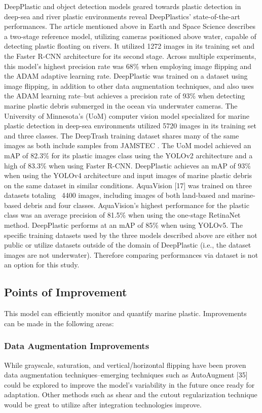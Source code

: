 \documentclass[a4paper,fleqn]{cas-dc}
\begin{document}
DeepPlastic and object detection models geared towards plastic detection in deep-sea and river plastic environments reveal DeepPlastics’ state-of-the-art performances.
The article mentioned above in Earth and Space Science \cite{https://doi.org/10.1029/2019EA000960} describes a two-stage reference model, utilizing cameras positioned above water, capable of detecting plastic floating on rivers. It utilized 1272 images in its training set and the Faster R-CNN architecture for its second stage. Across multiple experiments, this model’s highest precision rate was  68\% when employing image flipping and the ADAM adaptive learning rate. DeepPlastic was trained on a dataset using image flipping, in addition to other data augmentation techniques, and also uses the ADAM learning rate--but achieves a precision rate of 93\% when detecting marine plastic debris submerged in the ocean via underwater cameras.
The University of Minnesota’s (UoM) computer vision model \cite{fulton2018robotic} specialized for marine plastic detection in deep-sea environments utilized 5720 images in its training set and three classes. The DeepTrash training dataset shares many of the same images as both include samples from JAMSTEC \cite{JAMSTEC}. The UoM model achieved an mAP of 82.3\% for its plastic images class using the YOLOv2 architecture and a high of 83.3\% when using Faster R-CNN. DeepPlastic achieves an mAP of 93\% when using the YOLOv4 architecture and input images of marine plastic debris on the same dataset in similar conditions. 
AquaVision [17] was trained on three datasets totaling ~4400 images, including images of both land-based and marine-based debris and four classes. AquaVision’s highest performance for the plastic class was an average precision of 81.5\% when using the one-stage RetinaNet method. DeepPlastic performs at an mAP of 85\% when using YOLOv5.
The specific training datasets used by the three models described above are either not public or utilize datasets outside of the domain of DeepPlastic (i.e., the dataset images are not underwater). Therefore comparing performances via dataset is not an option for this study.


\subsection{Points of Improvement}
This model can efficiently monitor and quantify marine plastic. Improvements can be made in the following areas:

\subsubsection{Data Augmentation Improvements}
While grayscale, saturation, and vertical/horizontal flipping have been proven data augmentation techniques–emerging techniques such as AutoAugment [35] could be explored to improve the model’s variability in the future once ready for adaptation. Other methods such as shear and the cutout regularization technique would be great to utilize after integration technologies improve.
\end{document}
